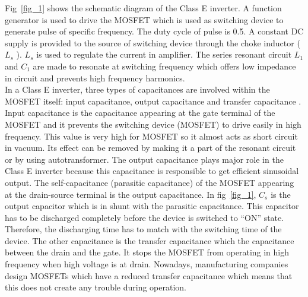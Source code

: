 \documentclass[journal,twoside]{IEEEtran}
\begin{document}
Fig~\ref{fig_1} shows the schematic diagram of the Class E inverter. A
function generator is used to drive the MOSFET which is
used as switching device to generate pulse of specific
frequency. The duty cycle of pulse is 0.5. A constant DC
supply is provided to the source of switching device through
the choke inductor ($L_s$ ). $L_s$ is used to regulate the current in
amplifier. The series resonant circuit $L_1$ and $C_1$ are made to
resonate at switching frequency which offers low impedance
in circuit and prevents high frequency harmonics.\\
In a Class E inverter, three types of capacitances are involved
within the MOSFET itself:
input capacitance, output
capacitance and transfer capacitance \cite{ClassRadio}. Input capacitance is
the capacitance appearing at the gate terminal of the
MOSFET and it prevents the switching device (MOSFET) to
drive easily in high frequency. This value is very high for
MOSFET so it almost acts as short circuit in vacuum. Its
effect can be removed by making it a part of the resonant
circuit or by using autotransformer. The output capacitance
plays major role in the Class E inverter because this
capacitance is responsible to get efficient sinusoidal output.
The self-capacitance (parasitic capacitance) of the MOSFET
appearing at the drain-source terminal is the output
capacitance. In fig~\ref{fig_1}, $C_s$ is the output capacitor which is in
shunt with the parasitic capacitance. This capacitor has to be
discharged completely before the device is switched to “ON”
state. Therefore, the discharging time has to match with the
switching time of the device. The other capacitance is the
transfer capacitance which the capacitance between the drain
and the gate. It stops the MOSFET from operating in high
frequency when high voltage is at drain. Nowadays,
manufacturing companies design MOSFETs which have a
reduced transfer capacitance which means that this does not
create any trouble during operation.\\
\end{document}
